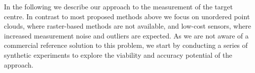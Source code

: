 In the following we describe our approach to the measurement of the target centre. In contrast to most proposed methods above we focus on unordered point clouds, where raster-based methods are not available, and low-cost sensors, where increased measurement noise and outliers are expected. As we are not aware of a commercial reference solution to this problem, we start by conducting a series of synthetic experiments to explore the viability and accuracy potential of the approach.



